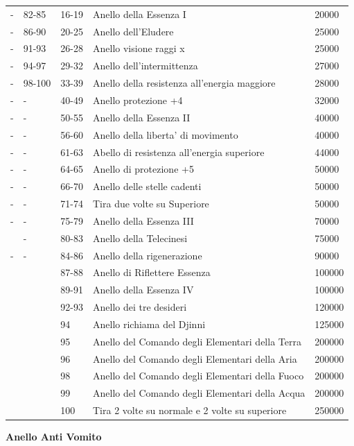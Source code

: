 \documentclass[a4paper,11pt,twoside,openany]{book}
\begin{document}
{\begin{tabular}{L{2cm} L{2cm} L{2cm} L{8cm} L{2cm}}
			- & 82-85 & 16-19 & Anello della Essenza I  & 20000\tabularnewline
			- & 86-90 & 20-25 & Anello dell'Eludere  & 25000\tabularnewline
			- & 91-93 & 26-28 & Anello visione raggi x & 25000\tabularnewline
			- & 94-97 & 29-32 & Anello dell'intermittenza  & 27000\tabularnewline
			- & 98-100 & 33-39 & Anello della resistenza all'energia maggiore & 28000\tabularnewline
			- & - & 40-49 & Anello protezione +4 & 32000\tabularnewline
			- & - & 50-55 & Anello della Essenza II & 40000\tabularnewline
			- & - & 56-60 & Anello della liberta' di movimento  & 40000\tabularnewline
			- & - & 61-63 & Abello di resistenza all'energia superiore & 44000\tabularnewline
			- & - & 64-65 & Anello di protezione +5 & 50000\tabularnewline
			- & - & 66-70 & Anello delle stelle cadenti  & 50000\tabularnewline
			- & - & 71-74 & Tira due volte su Superiore & 50000\tabularnewline
			- & - & 75-79 & Anello della Essenza III & 70000\tabularnewline
			& - & 80-83 & Anello della Telecinesi  & 75000\tabularnewline
			- & - & 84-86 & Anello della rigenerazione & 90000\tabularnewline
			& & 87-88 & Anello di Riflettere Essenza & 100000\tabularnewline
			& & 89-91 & Anello della Essenza IV & 100000\tabularnewline
			& & 92-93 & Anello dei tre desideri  & 120000\tabularnewline
			& & 94 & Anello richiama del Djinni  & 125000\tabularnewline
			& & 95 & Anello del Comando degli Elementari della Terra & 200000\tabularnewline
			& & 96 & Anello del Comando degli Elementari della Aria & 200000\tabularnewline
			& & 98 & Anello del Comando degli Elementari della Fuoco  & 200000\tabularnewline
			& & 99 & Anello del Comando degli Elementari della Acqua  & 200000\tabularnewline
			& & 100 & Tira 2 volte su normale e 2 volte su superiore & 250000\tabularnewline
			
		\end{tabular}
		
		\pagebreak
		
		\textbf{Anello Anti Vomito}
		
}
\end{document}
